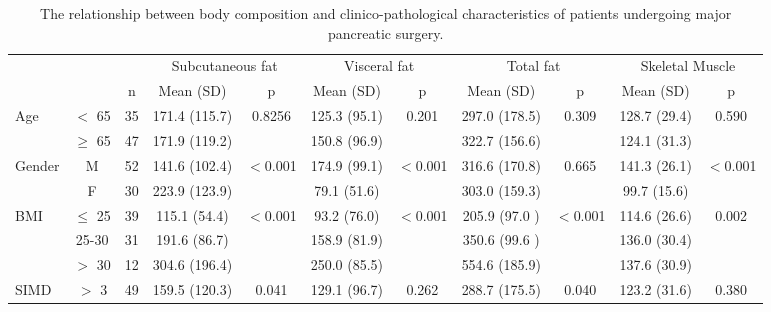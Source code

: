 \begin{sidewaystable}[p]
	\caption{The relationship between body composition and clinico-pathological characteristics of patients undergoing major pancreatic surgery.}
	\label{table:bc_clinical}
	\footnotesize
	\renewcommand{\arraystretch}{1.2} %
	\setlength{\tabcolsep}{9pt} %
	\centering
	\begin{tabular}{|l c c | c c| c c | c c | c c|}
		\hline
		                          &           &    & \multicolumn{2}{c|}{Subcutaneous fat} & \multicolumn{2}{c|}{Visceral fat} & \multicolumn{2}{c|}{Total fat} & \multicolumn{2}{c|}{Skeletal Muscle} \\
		                          &           & n  & Mean (SD)     & p                     & Mean (SD)     & p                 & Mean (SD)     & p              & Mean (SD)    & p                     \\ \hline
		Age                       & $<$ 65    & 35 & 171.4 (115.7) & 0.8256                & 125.3 (95.1)  & 0.201             & 297.0 (178.5) & 0.309          & 128.7 (29.4) & 0.590                 \\
		                          & $\geq$ 65 & 47 & 171.9 (119.2) &                       & 150.8 (96.9)  &                   & 322.7 (156.6) &                & 124.1 (31.3) &  \\
		Gender                    & M         & 52 & 141.6 (102.4) & $<$0.001              & 174.9 (99.1)  & $<$0.001          & 316.6 (170.8) & 0.665          & 141.3 (26.1) & $<$0.001              \\
		                          & F         & 30 & 223.9 (123.9) &                       & 79.1 (51.6)   &                   & 303.0 (159.3) &                & 99.7 (15.6)  &  \\
		BMI                       & $\leq$ 25 & 39 & 115.1 (54.4)  & $<$0.001              & 93.2 (76.0)   & $<$0.001          & 205.9 (97.0 ) & $<$0.001       & 114.6 (26.6) & 0.002                 \\
		                          & 25-30     & 31 & 191.6 (86.7)  &                       & 158.9 (81.9)  &                   & 350.6 (99.6 ) &                & 136.0 (30.4) &  \\
		                          & $>$ 30    & 12 & 304.6 (196.4) &                       & 250.0 (85.5)  &                   & 554.6 (185.9) &                & 137.6 (30.9) &  \\
		SIMD                      & $>$ 3     & 49 & 159.5 (120.3) & 0.041                 & 129.1 (96.7)  & 0.262             & 288.7 (175.5) & 0.040          & 123.2 (31.6) & 0.380                 \\

\end{tabular}
\end{sidewaystable}

